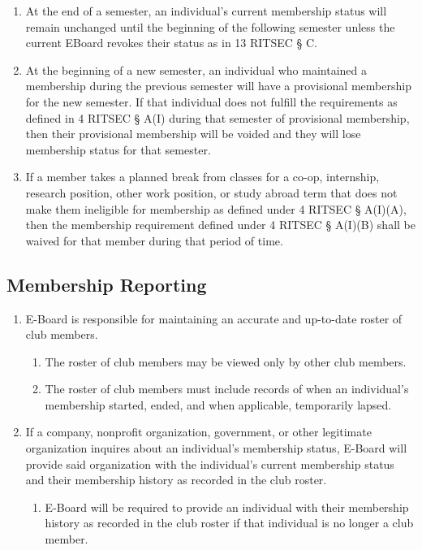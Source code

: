 \begin{enumerate}
  \item At the end of a semester, an individual's current membership status
    will remain unchanged until the beginning of the following semester unless
    the current EBoard revokes their status as in 13 RITSEC § C.
  \item At the beginning of a new semester, an individual who maintained a
    membership during the previous semester will have a provisional membership
    for the new semester. If that individual does not fulfill the requirements
    as defined in 4 RITSEC § A(I) during that semester of provisional
    membership, then their provisional membership will be voided and they will
    lose membership status for that semester.
  \item If a member takes a planned break from classes for a co-op, internship,
    research position, other work position, or study abroad term that does not
    make them ineligible for membership as defined under 4 RITSEC § A(I)(A),
    then the membership requirement defined under 4 RITSEC § A(I)(B) shall be
    waived for that member during that period of time.
\end{enumerate}

\subsection{Membership Reporting}

\begin{enumerate}
  \item E-Board is responsible for maintaining an accurate and up-to-date
    roster of club members.
  \begin{enumerate}
    \item The roster of club members may be viewed only by other club members.
    \item The roster of club members must include records of when an
      individual's membership started, ended, and when applicable, temporarily
      lapsed.
  \end{enumerate}
  \item If a company, nonprofit organization, government, or other legitimate
    organization inquires about an individual's membership status, E-Board will
    provide said organization with the individual's current membership status
    and their membership history as recorded in the club roster.
  \begin{enumerate}
    \item E-Board will be required to provide an individual with their
      membership history as recorded in the club roster if that individual is
      no longer a club member.
  \end{enumerate}
\end{enumerate}